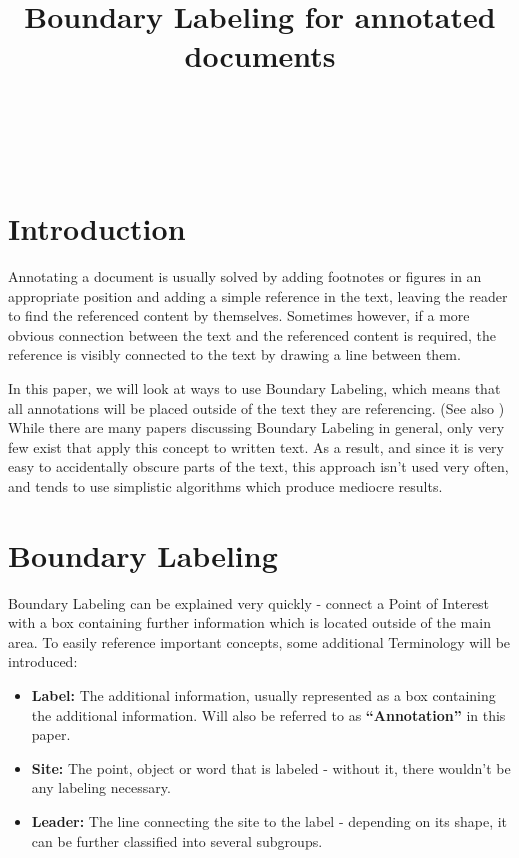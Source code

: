 \documentclass[11pt,a4paper]{article}
\title{Boundary Labeling for annotated documents}%
\author{
 \authorname{Jakob Klinger} \\
 \studentnumber{1125755} \\
 \curriculum{033 534} \\
 \email{e1125755@student.tuwien.ac.at}
}
\begin{document}
\maketitle


\section{Introduction}
Annotating a document is usually solved by adding footnotes or figures in an appropriate position and adding a simple reference in the text, leaving the reader to find the referenced content by themselves. Sometimes however, if a more obvious connection between the text and the referenced content is required, the reference is visibly connected to the text by drawing a line between them.

In this paper, we will look at ways to use Boundary Labeling, which means that all annotations will be placed outside of the text they are referencing. (See also \cite{Bekos2007}) While there are many papers discussing Boundary Labeling in general, only very few exist that apply this concept to written text. As a result, and since it is very easy to accidentally obscure parts of the text, this approach isn't used very often, and tends to use simplistic algorithms which produce mediocre results.


\section{Boundary Labeling}
Boundary Labeling can be explained very quickly -  connect a Point of Interest with a box containing further information which is located outside of the main area. To easily reference important concepts, some additional Terminology will be introduced:

\begin{itemize}
\item \textbf{Label:} The additional information, usually represented as a box containing the additional information. Will also be referred to as \textbf{``Annotation''} in this paper.
\item \textbf{Site:} The point, object or word that is labeled - without it, there wouldn't be any labeling necessary.%
\item \textbf{Leader:} The line connecting the site to the label - depending on its shape, it can be further classified into several subgroups.
\end{itemize}
\end{document}
